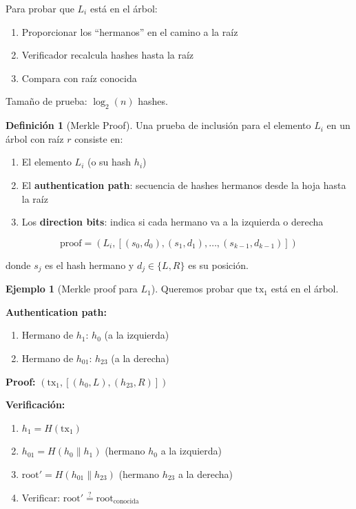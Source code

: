 \documentclass[11pt,a4paper,twoside,openright]{book}
\theoremstyle{definition}
\newtheorem{definition}{Definición}[chapter]
\newtheorem{example}{Ejemplo}[chapter]
\theoremstyle{plain}
\theoremstyle{remark}
\begin{document}
Para probar que $L_i$ está en el árbol:
\begin{enumerate}
    \item Proporcionar los ``hermanos'' en el camino a la raíz
    \item Verificador recalcula hashes hasta la raíz
    \item Compara con raíz conocida
\end{enumerate}

Tamaño de prueba: $\log_2(n)$ hashes.

\begin{definition}[Merkle Proof]
Una prueba de inclusión para el elemento $L_i$ en un árbol con raíz $r$ consiste en:
\begin{enumerate}
    \item El elemento $L_i$ (o su hash $h_i$)
    \item El \textbf{authentication path}: secuencia de hashes hermanos desde la hoja hasta la raíz
    \item Los \textbf{direction bits}: indica si cada hermano va a la izquierda o derecha
\end{enumerate}

\[ \text{proof} = (L_i, [(s_0, d_0), (s_1, d_1), \ldots, (s_{k-1}, d_{k-1})]) \]

donde $s_j$ es el hash hermano y $d_j \in \{L, R\}$ es su posición.
\end{definition}

\begin{example}[Merkle proof para $L_1$]
Queremos probar que $\text{tx}_1$ está en el árbol.

\textbf{Authentication path:}
\begin{enumerate}
    \item Hermano de $h_1$: $h_0$ (a la izquierda)
    \item Hermano de $h_{01}$: $h_{23}$ (a la derecha)
\end{enumerate}

\textbf{Proof:} $(\text{tx}_1, [(h_0, L), (h_{23}, R)])$

\textbf{Verificación:}
\begin{enumerate}
    \item $h_1 = H(\text{tx}_1)$
    \item $h_{01} = H(h_0 \| h_1)$ (hermano $h_0$ a la izquierda)
    \item $\text{root}' = H(h_{01} \| h_{23})$ (hermano $h_{23}$ a la derecha)
    \item Verificar: $\text{root}' \stackrel{?}{=} \text{root}_{\text{conocida}}$
\end{enumerate}
\end{example}
\end{document}
